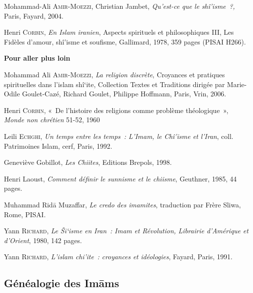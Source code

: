 Mohammad-Ali \textsc{Amir-Moezzi}, Christian Jambet, \emph{Qu'est-ce que
le shî'isme~?,} Paris, Fayard, 2004.

Henri \textsc{Corbin}, \emph{En Islam iranien}, Aspects spirituels et
philosophiques III, Les Fidèles d'amour, shî'isme et soufisme,
Gallimard, 1978, 359 pages (PISAI H266).

\textbf{Pour aller plus loin}

Mohammad Ali \textsc{Amir-Moezzi}, \emph{La religion discrète},
Croyances et pratiques spirituelles dans l'islam shî`ite, Collection
Textes et Traditions dirigée par Marie-Odile Goulet-Cazé, Richard
Goulet, Philippe Hoffmann, Paris, Vrin, 2006.

Henri \textsc{Corbin}, «~De l'histoire des religions comme problème
théologique~», \emph{Monde non chrétien} 51-52, 1960

Leili \textsc{Echghi}, \emph{Un temps entre les temps~: L'Imam, le
Chî'isme et l'Iran}, coll. Patrimoines Islam, cerf, Paris, 1992.

Geneviève Gobillot, \emph{Les Chiites}, Editions Brepols, 1998.

Henri Laoust, \emph{Comment définir le sunnisme et le chiisme},
Geuthner, 1985, 44 pages.

Muhammad Ridā Muzaffar, \emph{Le credo des imamites}, traduction par
Frère Sliwa, Rome, PISAI.

Yann \textsc{Richard}, \emph{Le Šī`isme en Iran~: Imam et Révolution,
Librairie d'Amérique et d'Orient}, 1980, 142 pages.

Yann \textsc{Richard}, \emph{L'islam chi'ite~: croyances et idéologies},
Fayard, Paris, 1991.

\textbf{\hfill\break
}

\subsection{Généalogie des Imāms}


 

